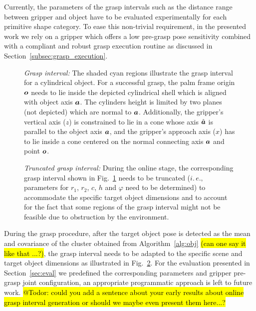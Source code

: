 Currently, the parameters of the grasp intervals such as the distance range between gripper and
object have to be evaluated experimentally for each primitive shape category. To ease this
non-trivial requirement, in the presented work we rely on a gripper which offers a low pre-grasp
pose sensitivity combined with a compliant and robust grasp execution routine as discussed in
Section~\ref{subsec:grasp_execution}.
%
\begin{figure}[t!] 
   \centering
     
    \caption{\textit{Grasp interval:} The shaded cyan regions illustrate the grasp interval for a
      cylindrical object. For a successful grasp, the palm frame origin $\mbox{\boldmath $o$}$ needs to lie
      inside the depicted cylindrical shell which is aligned with object axis $\mbox{\boldmath $a$}$. The
      cylinders height is limited by two planes (not depicted) which are normal to
      $\mbox{\boldmath $a$}$. Additionally, the gripper's vertical axis ($z$) is constrained to lie in a cone
      whose axis $\hat{\mbox{\boldmath $a$}}$ is parallel to the object axis $\mbox{\boldmath $a$}$, and the gripper's
      approach axis ($x$) has to lie inside a cone centered on the normal connecting axis $\mbox{\boldmath $a$}$
      and point $\mbox{\boldmath $o$}$.}
   \label{fig:grasp_interval}
   \vspace{-0.5cm}
\end{figure}
%
\begin{figure}[t!] 
   \centering
     
    \caption{\textit{Truncated grasp interval:} During the online stage, the corresponding grasp
      interval shown in Fig.~\ref{fig:grasp_interval} needs to be truncated ($i.\,e.,$ parameters
      for $r_1$, $r_2$, $c$, $h$ and $\varphi$ need to be determined) to accommodate the specific
      target object dimensions and to account for the fact that some regions of the grasp interval
      might not be feasible due to obstruction by the environment.}
   \label{fig:truncated_grasp_interval}
\end{figure}

During the grasp procedure, after the target object pose is detected as the mean and covariance of
the cluster obtained from Algorithm~\ref{alg:obj} \hl{(can one say it like that ...?)}, the grasp
interval needs to be adapted to the specific scene and target object dimensions as illustrated in
Fig.~\ref{fig:truncated_grasp_interval}. For the evaluation presented in Section~\ref{sec:eval} we
predefined the corresponding parameters and gripper pre-grasp joint configuration, an appropriate
programmatic approach is left to future work. \hl{@Todor: could you add a sentence about your early
  results about online grasp interval generation or should we maybe even present them here...?}
%

